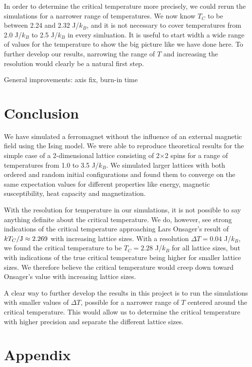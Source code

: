 \documentclass[reprint, english,notitlepage,nofootinbib]{revtex4-1}  %
\begin{document}
In order to determine the critical temperature more precisely, we could rerun the simulations for a narrower range of temperatures. We now know $T_C$ to be between 2.24 and 2.32 J/$k_B$, and it is not necessary to cover temperatures from 2.0 J/$k_B$ to 2.5 J/$k_B$ in every simluation. It is useful to start width a wide range of values for the temperature to show the big picture like we have done here. To further develop our results, narrowing the range of $T$ and increasing the resolution would clearly be a natural first step.


General improvements: axis fix, burn-in time

\section{Conclusion}

We have simulated a ferromagnet without the influence of an external magnetic field using the Ising model. We were able to reproduce theoretical results for the simple case of a 2-dimensional lattice consisting of 2$\times$2 spins for a range of temperatures from 1.0 to 3.5 J/$k_B$. We simulated larger lattices with both ordered and random initial configurations and found them to converge on the same expectation values for different properties like energy, magnetic susceptibility, heat capacity and magnetization.

With the resolution for temperature in our simulations, it is not possible to say anything definite about the critical temperature. We do, however, see strong indications of the critical temperature approaching Lars Onsager's result of $kT_C/\rm{J} \approx 2.269$ with increasing lattice sizes. With a resolution $\Delta T = 0.04$ J/$k_B$, we found the critical temperature to be $T_C = 2.28$ J/$k_B$ for all lattice sizes, but with indications of the true critical temperature being higher for smaller lattice sizes. We therefore believe the critical temperature would creep down toward Onsager's value with increasing lattice sizes.

A clear way to further develop the results in this project is to run the simulations with smaller values of $\Delta T$, possible for a narrower range of $T$ centered around the critical temperature. This would allow us to determine the critical temperature with higher precision and separate the different lattice sizes.



\section{Appendix}
\end{document}
